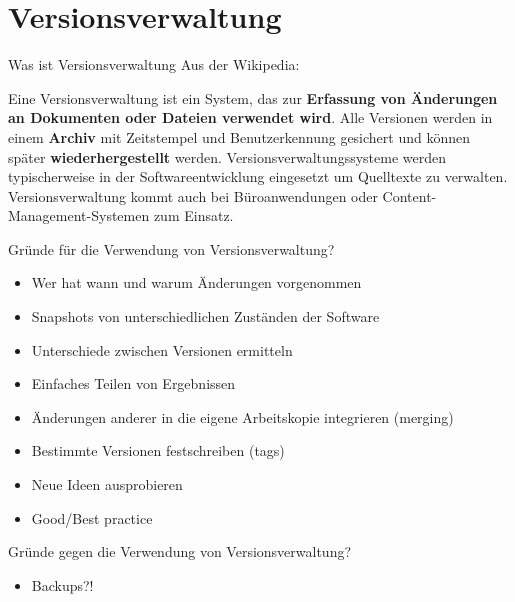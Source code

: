 \section{Versionsverwaltung}

\begin{frame}
  \tableofcontents[currentsection]
\end{frame}

\begin{frame}{Was ist Versionsverwaltung}
Aus der Wikipedia:

Eine Versionsverwaltung ist ein System,
das zur \textbf{Erfassung von Änderungen an
Dokumenten oder Dateien verwendet wird}.
Alle Versionen werden in einem \textbf{Archiv} mit
Zeitstempel und Benutzerkennung gesichert und können
später \textbf{wiederhergestellt} werden.
Versionsverwaltungssysteme werden typischerweise in der
Softwareentwicklung eingesetzt um Quelltexte zu verwalten.
Versionsverwaltung kommt auch bei Büroanwendungen oder
Content-Management-Systemen zum Einsatz.
\end{frame}

\begin{frame}{Gründe für die Verwendung von Versionsverwaltung?}
  \begin{itemize}
    \item Wer hat wann und warum Änderungen vorgenommen
    \item Snapshots von unterschiedlichen Zuständen der Software
    \item Unterschiede zwischen Versionen ermitteln
    \item Einfaches Teilen von Ergebnissen
    \item Änderungen anderer in die eigene Arbeitskopie integrieren (merging)
    \item Bestimmte Versionen festschreiben (tags)
    \item Neue Ideen ausprobieren
    \item Good/Best practice
  \end{itemize}
\end{frame}

\begin{frame}{Gründe gegen die Verwendung von Versionsverwaltung?}
  \begin{itemize}
    \item Backups?!
  \end{itemize}
\end{frame}

